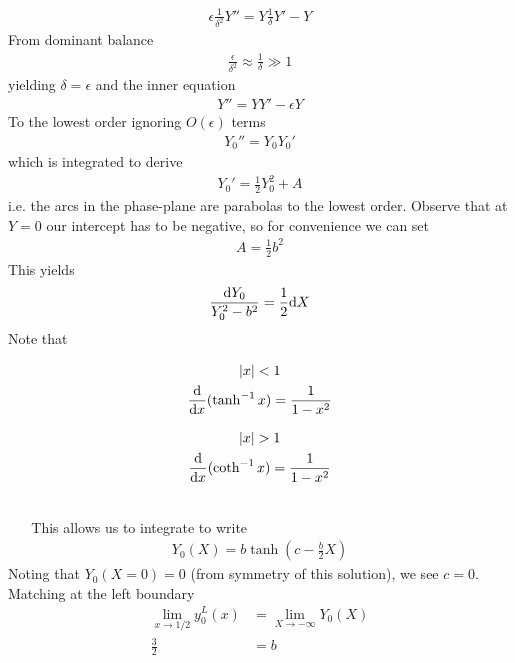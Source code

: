 \begin{gather*}
	\epsilon \frac{1}{\delta^2} Y'' = Y\frac{1}{\delta}Y'-Y
\end{gather*}
From dominant balance
\begin{gather*}
	\frac{\epsilon}{\delta^2} \approx \frac{1}{\delta} \gg 1
\end{gather*}
yielding $\delta = \epsilon$ and the inner equation
\begin{gather*}
	Y'' = YY' - \epsilon Y
\end{gather*}
To the lowest order ignoring $O(\epsilon)$ terms
\begin{gather*}
	Y_0'' = Y_0 Y_0' 
\end{gather*}
which is integrated to derive
\begin{gather*}
	Y_0' = \frac{1}{2} Y_0^2 + A
\end{gather*}
i.e. the arcs in the phase-plane are parabolas to the lowest order. Observe that at $Y=0$ our intercept has to be negative, so for convenience we can set
\begin{gather*}
	A = \frac{1}{2} b^2
\end{gather*}
This yields
\begin{gather*}
	\frac{\mathrm{d} Y_0}{Y_0^2 - b^2} = \frac{1}{2}\mathrm{d} X
\end{gather*}
Note that \\
\begin{minipage}[c]{0.49\linewidth}\small
	\begin{gather*}
	|x|<1 \\
	\frac{\mathrm{d}}{\mathrm{d} x} (\tanh^{-1} x) = \frac{1}{1-x^2}
	\end{gather*}
\end{minipage} \qquad 
\begin{minipage}[c]{0.49\linewidth} \small
	\begin{gather*}
	|x|>1 \\
	\frac{\md}{\md x} (\coth^{-1} x) = \frac{1}{1-x^2}
	\end{gather*}
\end{minipage} \\
\ \newline 
\ \newline 
This allows us to integrate to write
\begin{gather*}
	Y_0(X) = b \tanh \left(c - \frac{b}{2}X\right)
\end{gather*}
Noting that $Y_0(X=0)=0$ (from symmetry of this solution), we see $c=0$. Matching at the left boundary
\begin{align*}
	\lim\limits_{x \rightarrow 1/2} y^L_0(x) &= \lim\limits_{X \rightarrow -\infty} Y_0(X) \\
	\frac{3}{2} &= b
\end{align*} 
